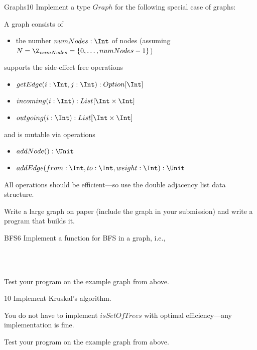 \documentclass[a4paper]{article}
\begin{document}
\header


\begin{problem}{Graphs}{10}
Implement a type $Graph$ for the following special case of graphs:

A graph consists of 
\begin{itemize}
 \item the number $numNodes:\Int$ of nodes (assuming $N=\Z_{numNodes}=\{0,\ldots,numNodes-1\}$)
\end{itemize}
supports the side-effect free operations
\begin{itemize}
 \item $getEdge(i:\Int,j:\Int):Option[\Int]$
 \item $incoming(i:\Int):List[\Int\times \Int]$
 \item $outgoing(i:\Int):List[\Int\times \Int]$
\end{itemize}
and is mutable via operations
\begin{itemize}
 \item $addNode():\Unit$
 \item $addEdge(from:\Int,to:\Int,weight:\Int):\Unit$
\end{itemize}

All operations should be efficient---so use the double adjacency list data structure.

Write a large graph on paper (include the graph in your submission) and write a program that builds it.
\end{problem}

\begin{problem}{BFS}{6}
Implement a function for BFS in a graph, i.e.,
\begin{acode}
\tb{}\\
\tb{}\\
\end{acode}

Test your program on the example graph from above.
\end{problem}

\begin{problem}{}{10}
Implement Kruskal's algorithm.

You do not have to implement $isSetOfTrees$ with optimal efficiency---any implementation is fine.

Test your program on the example graph from above.
\end{problem}
\end{document}
